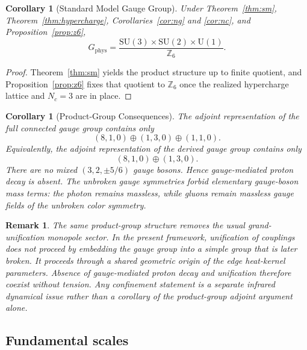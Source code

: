 \documentclass[11pt]{article}
\newtheorem{corollary}[theorem]{Corollary}
\newtheorem{remark}[theorem]{Remark}
\newcommand{\SU}{\mathrm{SU}}
\newcommand{\U}{\mathrm{U}}
\begin{document}
\begin{corollary}[Standard Model Gauge Group]
Under Theorem~\ref{thm:sm}, Theorem~\ref{thm:hypercharge}, Corollaries~\ref{cor:ng} and \ref{cor:nc}, and Proposition~\ref{prop:z6},
\[
G_{\mathrm{phys}}=
\frac{\SU(3)\times\SU(2)\times\U(1)}{\mathbb Z_6}.
\]
\end{corollary}

\begin{proof}
Theorem~\ref{thm:sm} yields the product structure up to finite quotient, and Proposition~\ref{prop:z6} fixes that quotient to $\mathbb Z_6$ once the realized hypercharge lattice and $N_c=3$ are in place.
\end{proof}

\begin{corollary}[Product-Group Consequences]
The adjoint representation of the full connected gauge group contains only
\[
(8,1,0)\oplus(1,3,0)\oplus(1,1,0).
\]
Equivalently, the adjoint representation of the derived gauge group contains only
\[
(8,1,0)\oplus(1,3,0).
\]
There are no mixed $(3,2,\pm 5/6)$ gauge bosons. Hence gauge-mediated proton decay is absent. The unbroken gauge symmetries forbid elementary gauge-boson mass terms: the photon remains massless, while gluons remain massless gauge fields of the unbroken color symmetry.
\end{corollary}

\begin{remark}
The same product-group structure removes the usual grand-unification monopole sector. In the present framework, unification of couplings does not proceed by embedding the gauge group into a simple group that is later broken. It proceeds through a shared geometric origin of the edge heat-kernel parameters. Absence of gauge-mediated proton decay and unification therefore coexist without tension. Any confinement statement is a separate infrared dynamical issue rather than a corollary of the product-group adjoint argument alone.
\end{remark}

\subsection{Fundamental scales}
\end{document}
